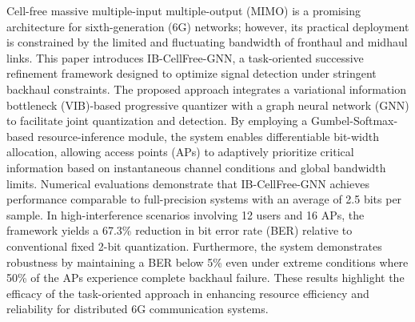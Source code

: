 Cell-free massive multiple-input multiple-output (MIMO) is a promising architecture for sixth-generation (6G) networks; however, its practical deployment is constrained by the limited and fluctuating bandwidth of fronthaul and midhaul links. This paper introduces IB-CellFree-GNN, a task-oriented successive refinement framework designed to optimize signal detection under stringent backhaul constraints. The proposed approach integrates a variational information bottleneck (VIB)-based progressive quantizer with a graph neural network (GNN) to facilitate joint quantization and detection. By employing a Gumbel-Softmax-based resource-inference module, the system enables differentiable bit-width allocation, allowing access points (APs) to adaptively prioritize critical information based on instantaneous channel conditions and global bandwidth limits. Numerical evaluations demonstrate that IB-CellFree-GNN achieves performance comparable to full-precision systems with an average of 2.5 bits per sample. In high-interference scenarios involving 12 users and 16 APs, the framework yields a 67.3\% reduction in bit error rate (BER) relative to conventional fixed 2-bit quantization. Furthermore, the system demonstrates robustness by maintaining a BER below 5\% even under extreme conditions where 50\% of the APs experience complete backhaul failure. These results highlight the efficacy of the task-oriented approach in enhancing resource efficiency and reliability for distributed 6G communication systems.